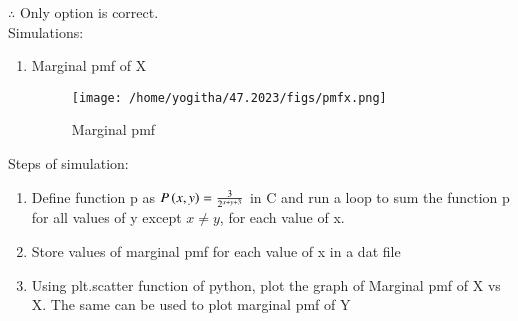 \documentclass[journal,12pt,twocolumn]{IEEEtran}
\theoremstyle{remark}
\begin{document}
$\therefore$ Only option  is correct. \\
Simulations:
\begin{enumerate}
\item Marginal pmf of X
\begin{figure}[H]
\texttt{[image: /home/yogitha/47.2023/figs/pmfx.png]}
\caption{Marginal pmf}
\label{fig:i_pmf}
\end{figure}
\end{enumerate}
Steps of simulation:
\begin{enumerate}
\item Define function p as $P\left(x,y\right)=\frac{3}{2^{x+y+3}}$ in C and run a loop to sum the function p for all values of y except $x\neq y$, for each value of x.
\item Store values of marginal pmf for each value of x in a dat file 
\item Using plt.scatter function of python, plot the graph of Marginal pmf of X vs X.
The same can be used to plot marginal pmf of Y
\end{enumerate}
\end{document}
